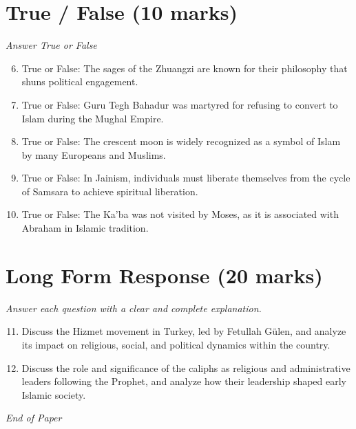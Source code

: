 \documentclass[12pt]{article}
\begin{document}
\section*{True / False (10 marks)}
\textit{Answer True or False}
\begin{enumerate}[label=\arabic*.]
\setcounter{enumi}{5}
\item True or False: The sages of the Zhuangzi are known for their philosophy that shuns political engagement.
\item True or False: Guru Tegh Bahadur was martyred for refusing to convert to Islam during the Mughal Empire.
\item True or False: The crescent moon is widely recognized as a symbol of Islam by many Europeans and Muslims.
\item True or False: In Jainism, individuals must liberate themselves from the cycle of Samsara to achieve spiritual liberation.
\item True or False: The Ka'ba was not visited by Moses, as it is associated with Abraham in Islamic tradition.
\end{enumerate}

\section*{Long Form Response (20 marks)}
\textit{Answer each question with a clear and complete explanation.}
\begin{enumerate}[label=\arabic*.]
\setcounter{enumi}{10}
\item Discuss the Hizmet movement in Turkey, led by Fetullah Gülen, and analyze its impact on religious, social, and political dynamics within the country.
\item Discuss the role and significance of the caliphs as religious and administrative leaders following the Prophet, and analyze how their leadership shaped early Islamic society.
\end{enumerate}

\vfill
\noindent\textit{End of Paper}
\end{document}
